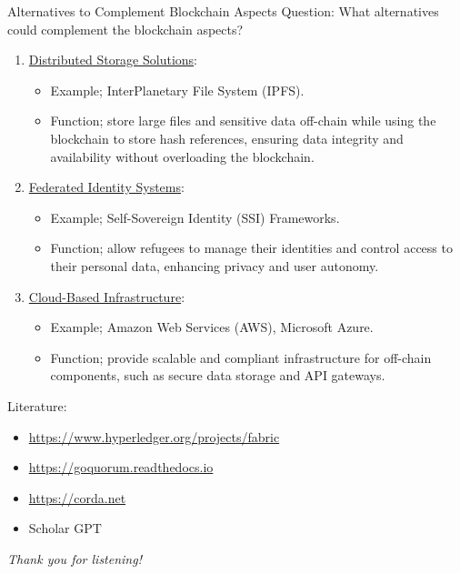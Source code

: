 \documentclass{beamer}
\begin{document}
\begin{frame}{Alternatives to Complement Blockchain Aspects}
\alert{Question}: What alternatives could complement the blockchain aspects?
\begin{enumerate}
\item \underline{Distributed Storage Solutions}: 
	\begin{itemize}
		\item Example; InterPlanetary File System (IPFS).
		\item Function; store large files and sensitive data off-chain while using the blockchain to store hash references, ensuring data integrity and availability without overloading the blockchain.
	\end{itemize}
\item \underline{Federated Identity Systems}:
	\begin{itemize}
		\item Example; Self-Sovereign Identity (SSI) Frameworks.
		\item Function; allow refugees to manage their identities and control access to their personal data, enhancing privacy and user autonomy.
	\end{itemize}
\item \underline{Cloud-Based Infrastructure}:
	\begin{itemize}
		\item Example; Amazon Web Services (AWS), Microsoft Azure.
		\item Function; provide scalable and compliant infrastructure for off-chain components, such as secure data storage and API gateways.
	\end{itemize}
\end{enumerate}
\end{frame}



\begin{frame}
Literature:
\begin{itemize}
\item \url{https://www.hyperledger.org/projects/fabric}
\item \url{https://goquorum.readthedocs.io}
\item \url{https://corda.net}
\item Scholar GPT 
\end{itemize}
\end{frame}


\begin{frame}
\centering \Large
  \emph{Thank you for listening!}
\end{frame}
\end{document}
